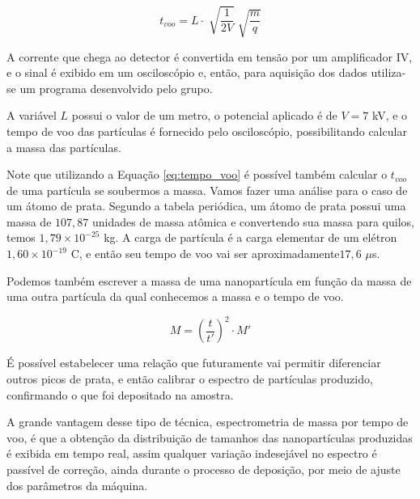 \begin{equation}
\label{eq:tempo_voo}
t_{voo} = L \cdot \sqrt[]{\frac{1}{2V}}  \sqrt[]{\frac{m}{q}} 
\end{equation}


A corrente que chega ao detector é convertida em tensão por um amplificador IV, e o sinal é exibido em um osciloscópio e, então, para aquisição dos dados utiliza-se um programa desenvolvido pelo grupo.

A variável $L$ possui o valor de um metro, o potencial aplicado é de $V = 7 $  kV, e o tempo de voo das partículas é fornecido pelo osciloscópio, possibilitando calcular a massa das partículas.

Note que utilizando a Equação \ref{eq:tempo_voo} é possível também calcular o $t_{voo}$ de uma partícula se soubermos a massa. Vamos fazer uma análise para o caso de um átomo de prata. Segundo a tabela periódica, um átomo de prata possui uma massa de $107,87$ unidades de massa atômica e convertendo sua massa para quilos, temos $1,79\times 10^{-25}$ kg. A carga de partícula é a carga elementar de um elétron $1,60\times 10^{-19}$ C, e então seu tempo de voo vai ser aproximadamente$17,6$ $\mu$s.

Podemos também escrever a massa de uma nanopartícula em função da massa de uma outra partícula da qual conhecemos a massa e o tempo de voo.

\begin{equation}
\label{eq:relacao_massa_tempo}
M = \left(\frac{t}{t'}\right)^2 \cdot M'
\end{equation}


É possível estabelecer uma relação que futuramente vai permitir diferenciar outros picos de prata, e então calibrar o espectro de partículas produzido, confirmando o que foi depositado na amostra.


A grande vantagem desse tipo de técnica, espectrometria de massa por tempo de voo, é que a obtenção da distribuição de tamanhos das nanopartículas produzidas é exibida em tempo real, assim qualquer variação indesejável no espectro é passível de correção, ainda durante o processo de deposição, por meio de ajuste  dos parâmetros da máquina. 
